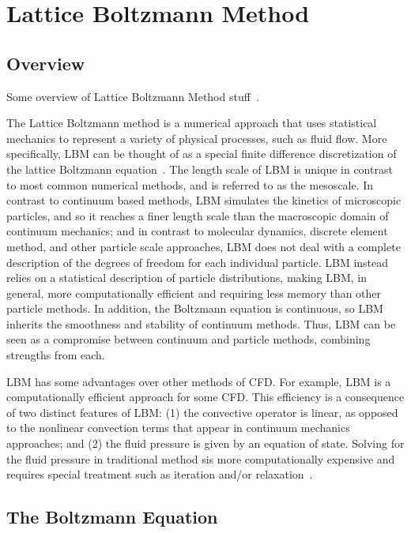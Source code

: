 \documentclass{article}
\begin{document}
\section{Lattice Boltzmann Method}

\subsection{Overview}

Some overview of Lattice Boltzmann Method stuff~\cite{grasinger2015simulation}.

The Lattice Boltzmann method is a numerical approach that uses statistical mechanics to represent a variety of physical processes, such as fluid flow.
More specifically, LBM can be thought of as a special finite difference discretization of the lattice Boltzmann equation~\cite{chen1998lattice}.
The length scale of LBM is unique in contrast to most common numerical methods, and is referred to as the mesoscale.
In contrast to continuum based methods, LBM simulates the kinetics of microscopic particles, and so it reaches a finer length scale than the macroscopic domain of continuum mechanics; and in contrast to molecular dynamics, discrete element method, and other particle scale approaches, LBM does not deal with a complete description of the degrees of freedom for each individual particle.
LBM instead relies on a statistical description of particle distributions, making LBM, in general, more computationally efficient and requiring less memory than other particle methods.
In addition, the Boltzmann equation is continuous, so LBM inherits the smoothness and stability of continuum methods.
Thus, LBM can be seen as a compromise between continuum and particle methods, combining strengths from each.

LBM has some advantages over other methods of CFD.
For example, LBM is a computationally efficient approach for some CFD.
This efficiency is a consequence of two distinct features of LBM: (1) the convective operator is linear, as opposed to the nonlinear convection terms that appear in continuum mechanics approaches; and (2) the fluid pressure is given by an equation of state.
Solving for the fluid pressure in traditional method sis more computationally expensive and requires special treatment such as iteration and/or relaxation~\cite{chen1998lattice}.

\subsection{The Boltzmann Equation}
\end{document}
